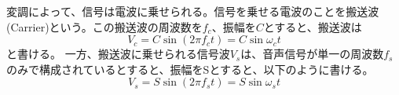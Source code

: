 変調によって、信号は電波に乗せられる。信号を乗せる電波のことを搬送波(Carrier)という。この搬送波の周波数を$f_c$、振幅を$C$とすると、搬送波は
\begin{equation}
V_c = C\sin(2 \pi f_c t) = C\sin\omega_c t
\end{equation}
と書ける。
一方、搬送波に乗せられる信号波$V_s$は、音声信号が単一の周波数$f_s$のみで構成されているとすると、振幅をSとすると、以下のように書ける。
\begin{equation}
V_s = S\sin(2 \pi f_s t) = S\sin\omega_s t \label{eq:AM_sig}
\end{equation}
\begin{figure}

\end{figure}
